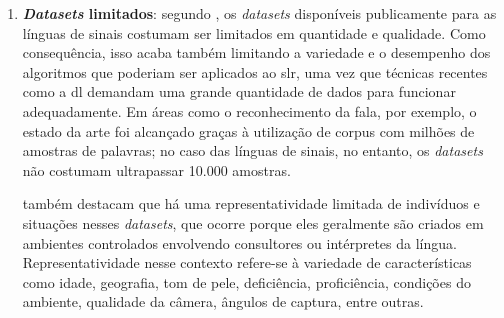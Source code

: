 \begin{enumerate}



      \item \textbf{\textit{Datasets} limitados}:
            segundo , os \textit{datasets} disponíveis publicamente para as línguas de sinais costumam ser limitados em quantidade e qualidade.
            Como consequência, isso acaba também limitando a variedade e o desempenho dos algoritmos que poderiam ser aplicados ao \acrshort{slr}, uma vez que técnicas recentes como a \acrlong{dl} demandam uma grande quantidade de dados para funcionar adequadamente.
            Em áreas como o reconhecimento da fala, por exemplo, o estado da arte foi alcançado graças à utilização de corpus com milhões de amostras de palavras; no caso das línguas de sinais, no entanto, os \textit{datasets} não costumam ultrapassar 10.000 amostras.




             também destacam que há uma representatividade limitada de indivíduos e situações nesses \textit{datasets}, que ocorre porque eles geralmente são criados em ambientes controlados envolvendo consultores ou intérpretes da língua.
            Representatividade nesse contexto refere-se à variedade de características como idade, geografia, tom de pele, deficiência, proficiência, condições do ambiente, qualidade da câmera, ângulos de captura, entre outras.



\end{enumerate}
